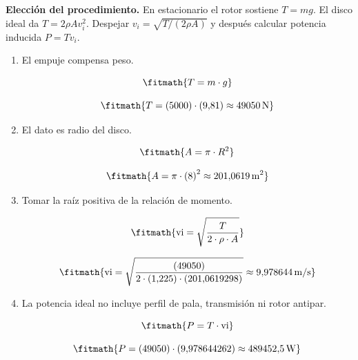 \noindent\textbf{Elección del procedimiento.} En estacionario el rotor sostiene $T=mg$. El disco ideal da $T=2\rho Av_i^2$. Despejar $v_i=\sqrt{T/(2\rho A)}$ y después calcular potencia inducida $P=Tv_i$.

\begin{enumerate}

\item El empuje compensa peso.

\[\fitmath{T=m\cdot g}\]

\[\fitmath{T=(5000)\cdot (9{,}81)\approx 49050\,\mathrm{N}}\]

\item El dato es radio del disco.

\[\fitmath{A=\pi\cdot {R}^{2}}\]

\[\fitmath{A=\pi\cdot {(8)}^{2}\approx 201{,}0619\,\mathrm{m^{2}}}\]

\item Tomar la raíz positiva de la relación de momento.

\[\fitmath{\mathrm{vi}=\sqrt{\frac{T}{2\cdot \rho\cdot A}}}\]

\[\fitmath{\mathrm{vi}=\sqrt{\frac{(49050)}{2\cdot (1{,}225)\cdot (201{,}0619298)}}\approx 9{,}978644\,\mathrm{m/s}}\]

\item La potencia ideal no incluye perfil de pala, transmisión ni rotor antipar.

\[\fitmath{P=T\cdot \mathrm{vi}}\]

\[\fitmath{P=(49050)\cdot (9{,}978644262)\approx 489452{,}5\,\mathrm{W}}\]

\end{enumerate}
